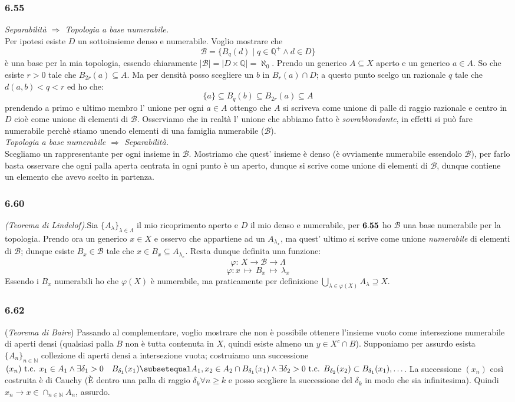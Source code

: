 \documentclass[a4paper,11pt]{article}
\newcommand{\ex}[1]{\subsubsection*{#1}}
\newcommand{\QQ}{\mathbb{Q}}
\newcommand{\NN}{\mathbb{N}}
\newcommand{\cart}{\times}
\newcommand{\tc}{\mbox{ t.c. }}
\newcommand{\rec}[1]{{\bf #1}}
\newcommand{\norm}[1]{\mid{#1}\mid}
\begin{document}
\ex{6.55}{\it Separabilità $\Rightarrow$ Topologia a base numerabile.}\\
Per ipotesi esiste $D$ un sottoinsieme denso e numerabile. Voglio mostrare che
$$\mathcal{B}=\{B_q(d)\mid q\in\QQ^+ \wedge d\in D\}$$
è una base per la mia topologia, essendo chiaramente $\norm{\mathcal{B}}=\norm{D\cart \QQ}=\aleph_0$. Prendo un generico $A\subseteq X$ aperto e un generico $a\in A$. So che esiste $r>0$ tale che $B_{2r}(a)\subseteq A$. Ma per densità posso scegliere un $b$ in $B_r(a)\cap D$; a questo punto scelgo un razionale $q$ tale che $d(a,b)<q<r$ ed ho che:
$$
\{a\}\subseteq B_q(b)\subseteq B_{2r}(a)\subseteq A
$$
prendendo a primo e ultimo membro l' unione per ogni $a\in A$ ottengo che $A$ si scriveva come unione di palle di raggio razionale e centro in $D$ cioè come unione di elementi di $\mathcal{B}$. Osserviamo che in realtà l' unione che abbiamo fatto è {\it sovrabbondante}, in effetti si può fare numerabile perchè stiamo unendo elementi di una famiglia numerabile ($\mathcal{B}$).\\
{\it Topologia a base numerabile $\Rightarrow$ Separabilità.}\\
Scegliamo un rappresentante per ogni insieme in $\mathcal{B}$. Mostriamo che quest' insieme è denso (è ovviamente numerabile essendolo $\mathcal{B}$), per farlo basta osservare che ogni palla aperta centrata in ogni punto è un aperto, dunque si scrive come unione di elementi di $\mathcal{B}$, dunque contiene un elemento che avevo scelto in partenza.\\
\ex{6.60} {\it (Teorema di Lindelof).}Sia $\{A_{\lambda}\}_{\lambda\in\Lambda}$ il mio ricoprimento aperto e $D$ il mio denso e numerabile, per $\rec{6.55}$ ho $\mathcal{B}$ una base numerabile per la topologia. Prendo ora un generico $x\in X$ e osservo che appartiene ad un $A_{\lambda_x}$, ma quest' ultimo si scrive come unione {\it numerabile} di elementi di ${\mathcal{B}}$; dunque esiste $B_x \in \mathcal{B}$ tale che $x\in B_x\subseteq A_{\lambda_x}$. Resta dunque definita una funzione:
$$
\varphi:\,  X \rightarrow \mathcal{B} \rightarrow \Lambda
$$
$$
\varphi: x\, \mapsto\, B_x\, \mapsto \, \lambda_x
$$
Essendo i $B_x$ numerabili ho che $\varphi(X)$ è numerabile, ma praticamente per definizione $\displaystyle \bigcup_{\lambda \in \varphi (X)}A_{\lambda}\supseteq X$.\\
\ex{6.62} ({\it Teorema di Baire}) Passando al complementare, voglio mostrare che non è possibile ottenere l'insieme vuoto come intersezione numerabile di aperti densi (qualsiasi palla $B$ non è tutta contenuta in $X$, quindi esiste almeno un $y \in X^c \cap B$). Supponiamo per assurdo esista $\{A_n\}_{n\in\NN}$ collezione di aperti densi a intersezione vuota; costruiamo una successione $(x_n) \tc x_1 \in A_1 \wedge \exists \delta_1 > 0 \quad B_{\delta_1}(x_1) \subsetequal A_1, x_2 \in A_2 \cap B_{\delta_1}(x_1) \wedge \exists \delta_2 > 0 \tc B_{\delta_2}(x_2) \subset B_{\delta_1}(x_1), \ldots $. La successione $(x_n)$ così costruita è di Cauchy (\`E dentro una palla di raggio $\delta_k \forall n \ge k$ e posso scegliere la successione del $\delta_k$ in modo che sia infinitesima). Quindi $x_n \rightarrow x \in \cap_{n\in\NN} A_n$, assurdo.
\end{document}
